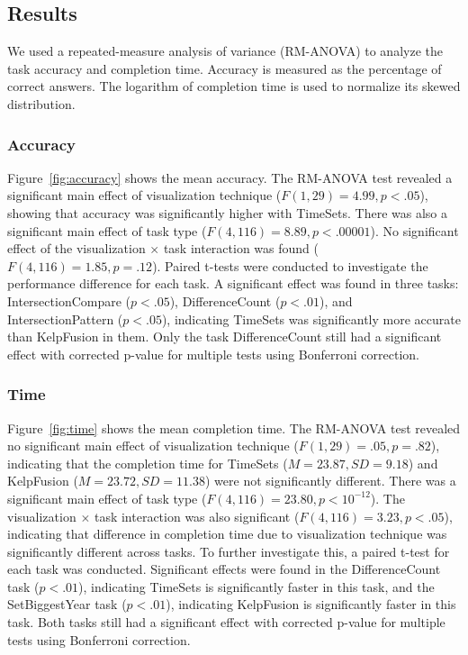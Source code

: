 \subsection{Results}
We used a repeated-measure analysis of variance (RM-ANOVA) to analyze the task accuracy and completion time. Accuracy is measured as the percentage of correct answers. The logarithm of completion time is used to normalize its skewed distribution.

\subsubsection{Accuracy}
Figure~\ref{fig:accuracy} shows the mean accuracy. The RM-ANOVA test revealed a significant main effect of visualization technique ($F(1,29)=4.99, p<.05$), showing that accuracy was significantly higher with TimeSets. There was also a significant main effect of task type ($F(4,116)=8.89, p<.00001$). No significant effect of the visualization $\times$ task interaction was found ($F(4,116)=1.85, p=.12$). Paired t-tests were conducted to investigate the performance difference for each task. A significant effect was found in three tasks: IntersectionCompare ($p<.05$), DifferenceCount ($p<.01$), and IntersectionPattern ($p<.05$), indicating TimeSets was significantly more accurate than KelpFusion in them. Only the task DifferenceCount still had a significant effect with corrected p-value for multiple tests using Bonferroni correction.

\subsubsection{Time}
Figure~\ref{fig:time} shows the mean completion time. The RM-ANOVA test revealed no significant main effect of visualization technique ($F(1,29)=.05, p=.82$), indicating that the completion time for TimeSets ($M=23.87,SD=9.18$) and KelpFusion ($M=23.72,SD=11.38$) were not significantly different. There was a significant main effect of task type ($F(4,116)=23.80, p<10^{-12}$). The visualization $\times$ task interaction was also significant ($F(4,116)=3.23,p<.05$), indicating that difference in completion time due to visualization technique was significantly different across tasks. To further investigate this, a paired t-test for each task was conducted. Significant effects were found in the DifferenceCount task ($p<.01$), indicating TimeSets is significantly faster in this task, and the SetBiggestYear task ($p<.01$), indicating KelpFusion is significantly faster in this task. Both tasks still had a significant effect with corrected p-value for multiple tests using Bonferroni correction.


